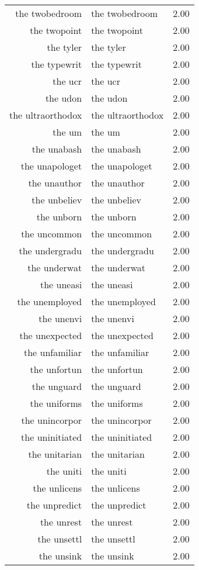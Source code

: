 \begin{table}[ht]
\begin{tabular}{rlr}
  the twobedroom & the twobedroom & 2.00 \\ 
  the twopoint & the twopoint & 2.00 \\ 
  the tyler & the tyler & 2.00 \\ 
  the typewrit & the typewrit & 2.00 \\ 
  the ucr & the ucr & 2.00 \\ 
  the udon & the udon & 2.00 \\ 
  the ultraorthodox & the ultraorthodox & 2.00 \\ 
  the um & the um & 2.00 \\ 
  the unabash & the unabash & 2.00 \\ 
  the unapologet & the unapologet & 2.00 \\ 
  the unauthor & the unauthor & 2.00 \\ 
  the unbeliev & the unbeliev & 2.00 \\ 
  the unborn & the unborn & 2.00 \\ 
  the uncommon & the uncommon & 2.00 \\ 
  the undergradu & the undergradu & 2.00 \\ 
  the underwat & the underwat & 2.00 \\ 
  the uneasi & the uneasi & 2.00 \\ 
  the unemployed & the unemployed & 2.00 \\ 
  the unenvi & the unenvi & 2.00 \\ 
  the unexpected & the unexpected & 2.00 \\ 
  the unfamiliar & the unfamiliar & 2.00 \\ 
  the unfortun & the unfortun & 2.00 \\ 
  the unguard & the unguard & 2.00 \\ 
  the uniforms & the uniforms & 2.00 \\ 
  the unincorpor & the unincorpor & 2.00 \\ 
  the uninitiated & the uninitiated & 2.00 \\ 
  the unitarian & the unitarian & 2.00 \\ 
  the uniti & the uniti & 2.00 \\ 
  the unlicens & the unlicens & 2.00 \\ 
  the unpredict & the unpredict & 2.00 \\ 
  the unrest & the unrest & 2.00 \\ 
  the unsettl & the unsettl & 2.00 \\ 
  the unsink & the unsink & 2.00 \\ 

\end{tabular}
\end{table}
